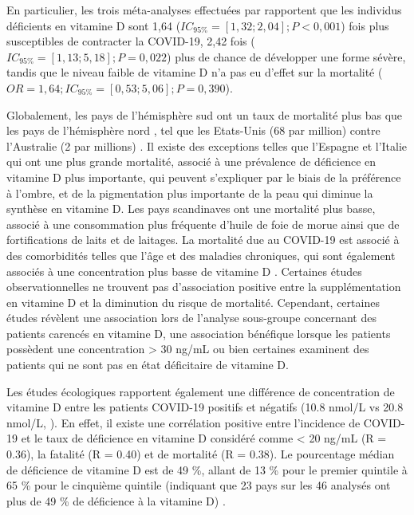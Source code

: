 \documentclass[
  a4paper,
  DIV=11,
  numbers=noendperiod,
  listof=totoc]{scrreprt}
\begin{document}
En particulier, les trois méta-analyses effectuées par
\textcite{Kaya.2021} rapportent que les individus déficients en vitamine
D sont 1,64 (\(IC_{95\%} = [1,32 ; 2,04] ; P < 0,001\)) fois plus
susceptibles de contracter la COVID-19, 2,42 fois
(\(IC_{95\%} = [1,13 ; 5,18] ; P = 0,022\)) plus de chance de développer
une forme sévère, tandis que le niveau faible de vitamine D n'a pas eu
d'effet sur la mortalité
(\(OR = 1,64 ; IC_{95\%} = [0,53 ; 5,06] ; P = 0,390\)).

Globalement, les pays de l'hémisphère sud ont un taux de mortalité plus
bas que les pays de l'hémisphère nord \autocite{Contreras-Bolívar.2023},
tel que les Etats-Unis (68 par million) contre l'Australie (2 par
millions) \autocite{Bishop.2021}. Il existe des exceptions telles que
l'Espagne et l'Italie qui ont une plus grande mortalité, associé à une
prévalence de déficience en vitamine D plus importante, qui peuvent
s'expliquer par le biais de la préférence à l'ombre, et de la
pigmentation plus importante de la peau qui diminue la synthèse en
vitamine D. Les pays scandinaves ont une mortalité plus basse, associé à
une consommation plus fréquente d'huile de foie de morue ainsi que de
fortifications de laits et de laitages. La mortalité due au COVID-19 est
associé à des comorbidités telles que l'âge et des maladies chroniques,
qui sont également associés à une concentration plus basse de vitamine D
\autocite{Bishop.2021}. Certaines études observationnelles ne trouvent
pas d'association positive entre la supplémentation en vitamine D et la
diminution du risque de mortalité. Cependant, certaines études révèlent
une association lors de l'analyse sous-groupe concernant des patients
carencés en vitamine D, une association bénéfique lorsque les patients
possèdent une concentration \textgreater{} 30 ng/mL
\autocite{Oristrell.2022} ou bien certaines examinent des patients qui
ne sont pas en état déficitaire de vitamine D.

Les études écologiques rapportent également une différence de
concentration de vitamine D entre les patients COVID-19 positifs et
négatifs (10.8 nmol/L vs 20.8 nmol/L, \textcite{Baktash.2021}). En
effet, il existe une corrélation positive entre l'incidence de COVID-19
et le taux de déficience en vitamine D considéré comme \textless{} 20
ng/mL (R = 0.36), la fatalité (R = 0.40) et de mortalité (R = 0.38). Le
pourcentage médian de déficience de vitamine D est de 49 \%, allant de
13 \% pour le premier quintile à 65 \% pour le cinquième quintile
(indiquant que 23 pays sur les 46 analysés ont plus de 49 \% de
déficience à la vitamine D) \autocite{Mariani.2021}.
\end{document}
